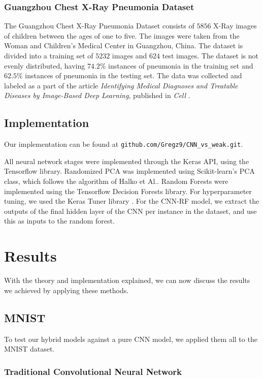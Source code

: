 \documentclass[onecolumn,10pt,cleanfoot]{asme2ej}
\begin{document}
\subsubsection{Guangzhou Chest X-Ray Pneumonia Dataset}

The Guangzhou Chest X-Ray Pneumonia Dataset consists of $5856$ X-Ray images of children between the ages of one to five. The images were taken from the Woman and Children's Medical Center in Guangzhou, China. The dataset is divided into a training set of $5232$ images and $624$ test images. The dataset is not evenly distributed, having $74.2\%$ instances of pneumonia in the training set and $62.5\%$ instances of pneumonia in the testing set. The data was collected and labeled as a part of the article {\it Identifying Medical Diagnoses and Treatable Diseases by Image-Based Deep Learning}, published in {\it Cell} \cite{xray}.

\subsection{Implementation}

Our implementation can be found at \texttt{github.com/Gregz9/CNN\_vs\_weak.git}.

All neural network stages were implemented through the Keras API, using the Tensorflow library. Randomized PCA was implemented using Scikit-learn's PCA class, which follows the algorithm of Halko et Al.. Random Forests were implemented using the Tensorflow Decision Forests library. For hyperparameter tuning, we used the Keras Tuner library \cite{kerastuner}. For the CNN-RF model, we extract the outputs of the final hidden layer of the CNN per instance in the dataset, and use this as inputs to the random forest.

\section{Results}

With the theory and implementation explained, we can now discuss the results we achieved by applying these methods.

\subsection{MNIST}

To test our hybrid models against a pure CNN model, we applied them all to the MNIST dataset.

\subsubsection{Traditional Convolutional Neural Network}
\end{document}
